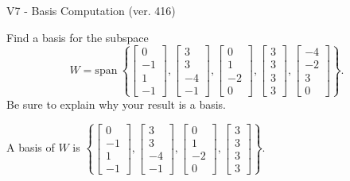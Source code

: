 \begin{exercise}
  \begin{exerciseTitle}V7 - Basis Computation (ver. 416)\end{exerciseTitle}
  \begin{exerciseStatement}
    Find a basis for the subspace 
\[W=\mathrm{span}\ \left\{\left[\begin{array}{r}
0 \\
-1 \\
1 \\
-1
\end{array}\right] , \left[\begin{array}{r}
3 \\
3 \\
-4 \\
-1
\end{array}\right] , \left[\begin{array}{r}
0 \\
1 \\
-2 \\
0
\end{array}\right] , \left[\begin{array}{r}
3 \\
3 \\
3 \\
3
\end{array}\right] , \left[\begin{array}{r}
-4 \\
-2 \\
3 \\
0
\end{array}\right]\right\}.\]
 Be sure to explain why your result is a basis.


  \end{exerciseStatement}
  \begin{exerciseAnswer}
   A basis of \(W\) is  \(\left\{\left[\begin{array}{r}
0 \\
-1 \\
1 \\
-1
\end{array}\right] , \left[\begin{array}{r}
3 \\
3 \\
-4 \\
-1
\end{array}\right] , \left[\begin{array}{r}
0 \\
1 \\
-2 \\
0
\end{array}\right] , \left[\begin{array}{r}
3 \\
3 \\
3 \\
3
\end{array}\right]\right\}\).
  


  \end{exerciseAnswer}
\end{exercise}